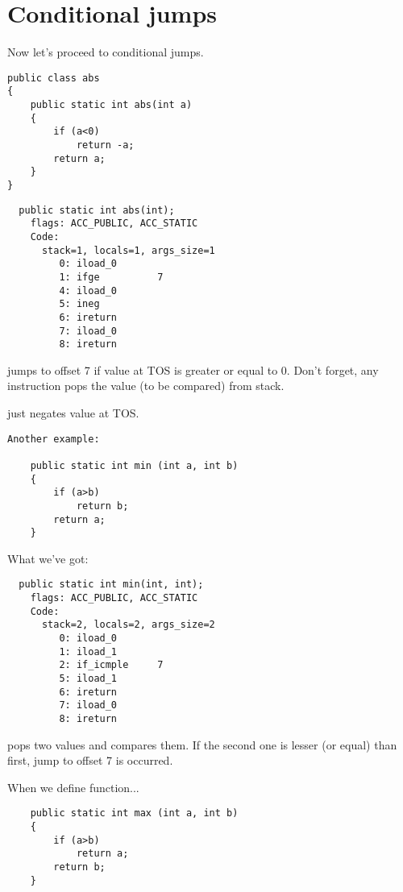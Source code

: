 \section{Conditional jumps}

Now let's proceed to conditional jumps.

\begin{lstlisting}
public class abs
{
	public static int abs(int a)
	{
		if (a<0)
			return -a;
		return a;
	}
}
\end{lstlisting}

\begin{lstlisting}
  public static int abs(int);
    flags: ACC_PUBLIC, ACC_STATIC
    Code:
      stack=1, locals=1, args_size=1
         0: iload_0       
         1: ifge          7
         4: iload_0       
         5: ineg          
         6: ireturn       
         7: iload_0       
         8: ireturn       
\end{lstlisting}

 jumps to offset 7 if value at \ac{TOS} is greater or equal to 0.
Don't forget, any  instruction pops the value (to be compared) from stack.

 just negates value at \ac{TOS}.

\begin{lstlisting}
Another example:

	public static int min (int a, int b)
	{
		if (a>b)
			return b;
		return a;
	}
\end{lstlisting}

What we've got:

\begin{lstlisting}
  public static int min(int, int);
    flags: ACC_PUBLIC, ACC_STATIC
    Code:
      stack=2, locals=2, args_size=2
         0: iload_0       
         1: iload_1       
         2: if_icmple     7
         5: iload_1       
         6: ireturn       
         7: iload_0       
         8: ireturn       
\end{lstlisting}

 pops two values and compares them. 
If the second one is lesser (or equal) than first, jump to offset 7 is occurred.

When we define  function...

\begin{lstlisting}
	public static int max (int a, int b)
	{
		if (a>b)
			return a;
		return b;
	}
\end{lstlisting}

